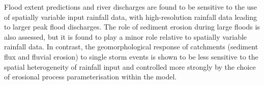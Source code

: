 Flood extent predictions and river discharges are found to be sensitive to the use of spatially variable input rainfall data, with high-resolution rainfall data leading to larger peak flood discharges. The role of sediment erosion during large floods is also assessed, but it is found to play a minor role relative to spatially variable rainfall data. In contrast, the geomorphological response of catchments (sediment flux and fluvial erosion) to single storm events is shown to be less sensitive to the spatial heterogeneity of rainfall input and controlled more strongly by the choice of erosional process parameterisation within the model.



%
%
%

